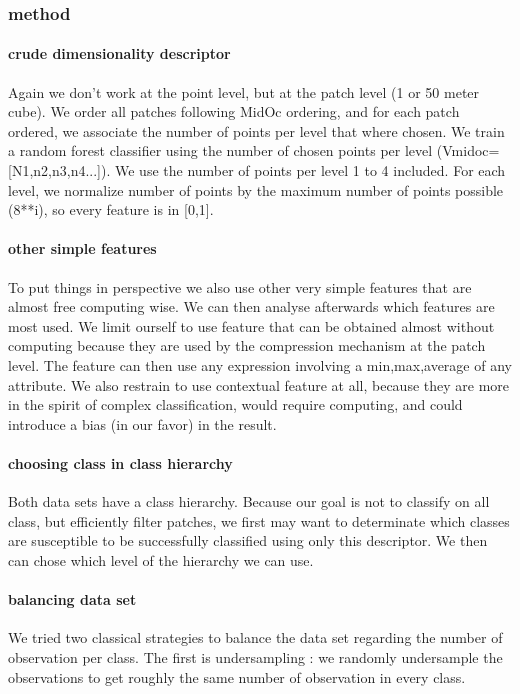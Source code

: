		\subsubsection{method}
			\paragraph{crude dimensionality descriptor}
				Again we don't work at the point level, but at the patch level (1 or 50 meter cube).
				We order all patches following MidOc ordering, and for each patch ordered, we associate the number of points per level that where chosen.
				We train a random forest classifier using the number of chosen points per level (Vmidoc=[N1,n2,n3,n4...]).
				We use the number of points per level 1 to 4 included. For each level, we normalize number of points by the maximum number of points possible (8**i), so every feature is in [0,1].
			
			\paragraph{other simple features}
				To put things in perspective we also use other very simple features that are almost free computing wise. We can then analyse afterwards which features are most used.
				We limit ourself to use feature that can be obtained almost without computing because they are used by the compression mechanism at the patch level. The feature can then use any expression involving a min,max,average of any attribute.
				We also restrain to use contextual feature at all, because they are more in the spirit of complex classification, would require computing, and could introduce a bias (in our favor) in the result.
			
			\paragraph{choosing class in class hierarchy}
				Both data sets have a class hierarchy. Because our goal is not to classify on all class, but efficiently filter patches, we first may want to determinate which classes are susceptible to be successfully classified using only this descriptor. 
				We then can chose which level of the hierarchy we can use.
				
			\paragraph{balancing data set}
				We tried two classical strategies to balance the data set regarding the number of observation per class.
				The first is undersampling : we randomly undersample the observations to get roughly the same number of observation in every class.
				
